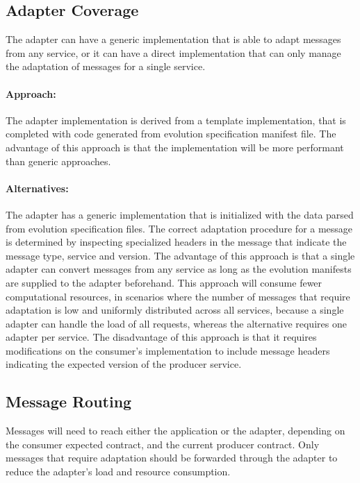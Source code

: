 \subsection{Adapter Coverage} %
\label{sec:adapter_polymorphism}

The adapter can have a generic implementation that is able to adapt messages from any service, or it can
have a direct implementation that can only manage the adaptation of messages for a single service.

\paragraph{Approach:}
The adapter implementation is derived from a template implementation,
that is completed with code generated from evolution specification manifest file.
The advantage of this approach is that the implementation will be more performant than generic approaches.

\paragraph{Alternatives:}
The adapter has a generic implementation that is initialized with the data parsed from evolution specification files.
The correct adaptation procedure for a message is determined by inspecting specialized headers in the
message that indicate the message type, service and version.
The advantage of this approach is that a single adapter can convert messages from any service as long as the evolution manifests are supplied to the adapter beforehand.
This approach will consume fewer computational resources, in scenarios where the number of messages that require adaptation is low and uniformly distributed across all services,
because a single adapter can handle the load of all requests, whereas the alternative requires one adapter per service.
The disadvantage of this approach is that it requires modifications on the consumer's implementation to include message headers indicating the expected version of the producer service.

\subsection{Message Routing} %
\label{sec:message_routing}

Messages will need to reach either the application or the adapter, depending on the consumer expected contract, and the current producer contract.
Only messages that require adaptation should be forwarded through the adapter to reduce the adapter's load and resource consumption.

